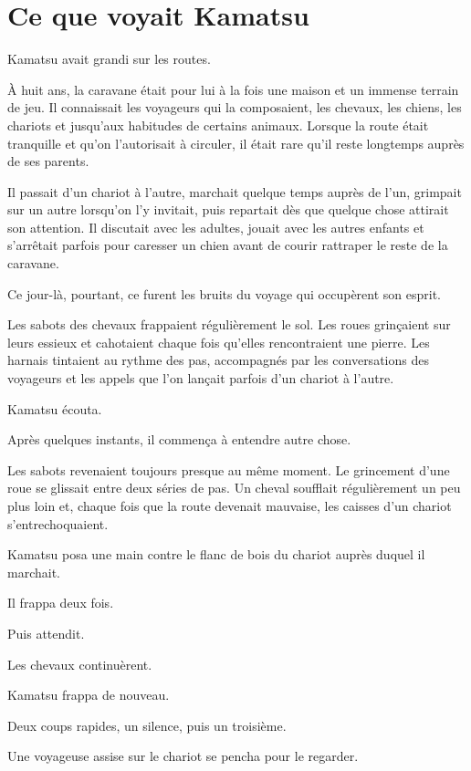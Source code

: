 \chapter{Ce que voyait Kamatsu}
\label{chap:ce-que-voyait-kamatsu}

Kamatsu avait grandi sur les routes.

À huit ans, la caravane était pour lui à la fois une maison et un immense
terrain de jeu. Il connaissait les voyageurs qui la composaient, les chevaux,
les chiens, les chariots et jusqu'aux habitudes de certains animaux. Lorsque
la route était tranquille et qu'on l'autorisait à circuler, il était rare
qu'il reste longtemps auprès de ses parents.

Il passait d'un chariot à l'autre, marchait quelque temps auprès de l'un,
grimpait sur un autre lorsqu'on l'y invitait, puis repartait dès que quelque
chose attirait son attention. Il discutait avec les adultes, jouait avec les
autres enfants et s'arrêtait parfois pour caresser un chien avant de courir
rattraper le reste de la caravane.

Ce jour-là, pourtant, ce furent les bruits du voyage qui occupèrent son esprit.

Les sabots des chevaux frappaient régulièrement le sol. Les roues grinçaient
sur leurs essieux et cahotaient chaque fois qu'elles rencontraient une pierre.
Les harnais tintaient au rythme des pas, accompagnés par les conversations des
voyageurs et les appels que l'on lançait parfois d'un chariot à l'autre.

Kamatsu écouta.

Après quelques instants, il commença à entendre autre chose.

Les sabots revenaient toujours presque au même moment. Le grincement d'une roue
se glissait entre deux séries de pas. Un cheval soufflait régulièrement un peu
plus loin et, chaque fois que la route devenait mauvaise, les caisses d'un
chariot s'entrechoquaient.

Kamatsu posa une main contre le flanc de bois du chariot auprès duquel il
marchait.

Il frappa deux fois.

Puis attendit.

Les chevaux continuèrent.

Kamatsu frappa de nouveau.

Deux coups rapides, un silence, puis un troisième.

Une voyageuse assise sur le chariot se pencha pour le regarder.

